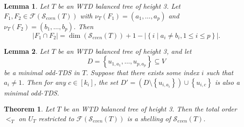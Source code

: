 \documentclass[10pt,a4paper]{amsart}
\newtheorem{lemma}{Lemma}
\newtheorem{theorem}{Theorem}
\newcommand\Set[2]{\left\lbrace #1 \mid #2 \right\rbrace}
\newcommand{\calS}{\mathcal{S}}
\newcommand\set[1]{\left\lbrace #1 \right\rbrace}
\begin{document}
\begin{lemma}\label{lem. F1 cap F2 size}
    Let $T$ be an WTD balanced tree of height 3.
    Let $F_1, F_2 \in \mathcal{F}(\calS_{even}(T))$ with $\nu_T(F_1) = (a_1,\dots,a_p)$ and $\nu_T(F_2) = (b_1,\dots,b_p)$.
    Then
    $$
    |F_1 \cap F_2| = \dim(\calS_{even}(T)) + 1 - |\Set{i}{a_i \neq b_i, 1\leq i \leq p}|.
    $$
\end{lemma}

\begin{lemma}\label{lem. non-zero to 1 is TDS}
    Let $T$ be an WTD balanced tree of height 3, and let 
    $$
    D = \set{u_{1,a_1},\dots,u_{p,a_p}} \subseteq V
    $$ 
    be a minimal odd-TDS in $T$.
    Suppose that there exists some index $i$ such that $a_i \neq 1$.
    Then for any $c \in [k_i]$, the set
    $D' = (D\setminus \set{u_{i,a_i}}) \cup \set{u_{i,c}}$
    is also a minimal odd-TDS.
\end{lemma}

\begin{theorem}\label{thm. even stable complex is shellable}
    Let $T$ be an WTD balanced tree of height 3.
    Then the total order $<_T$ on $U_T$ restricted to $\mathcal{F}(\calS_{even}(T))$ is a shelling of $\calS_{even}(T)$.
\end{theorem}
\end{document}
